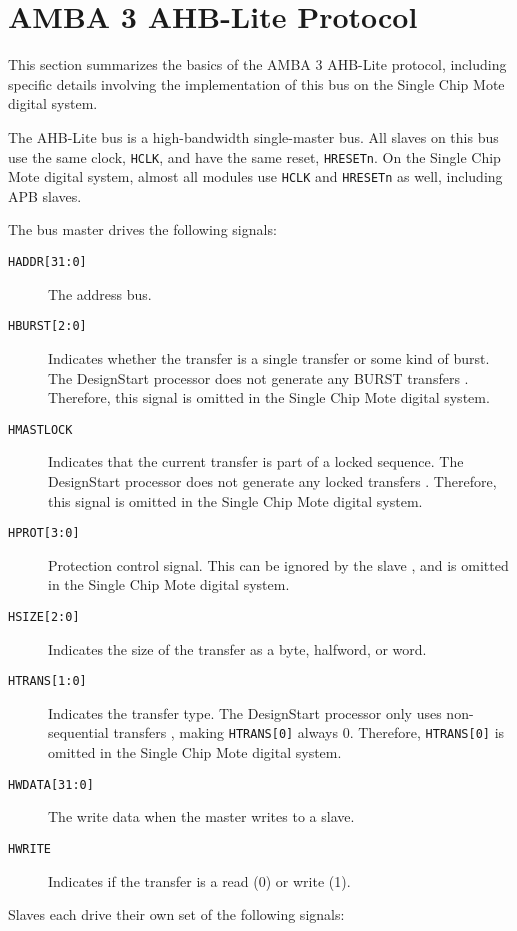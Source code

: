 \section{AMBA 3 AHB-Lite Protocol}
This section summarizes the basics of the AMBA 3 AHB-Lite protocol, including specific details involving the implementation of this bus on the Single Chip Mote digital system.

The AHB-Lite bus is a high-bandwidth single-master bus. All slaves on this bus use the same clock, \texttt{HCLK}, and have the same reset, \texttt{HRESETn}. On the Single Chip Mote digital system, almost all modules use \texttt{HCLK} and \texttt{HRESETn} as well, including APB slaves.

The bus master drives the following signals:

\begin{description}
	\item[\texttt{HADDR[31:0]}] The address bus.
	\item[\texttt{HBURST[2:0]}] Indicates whether the transfer is a single transfer or some kind of burst. The DesignStart processor does not generate any BURST transfers \cite{ahblite-mit}. Therefore, this signal is omitted in the Single Chip Mote digital system.
	\item[\texttt{HMASTLOCK}] Indicates that the current transfer is part of a locked sequence. The DesignStart processor does not generate any locked transfers \cite{ahblite-mit}. Therefore, this signal is omitted in the Single Chip Mote digital system.
	\item[\texttt{HPROT[3:0]}] Protection control signal. This can be ignored by the slave \cite{ahblite-mit}, and is omitted in the Single Chip Mote digital system.
	\item[\texttt{HSIZE[2:0]}] Indicates the size of the transfer as a byte, halfword, or word.
	\item[\texttt{HTRANS[1:0]}] Indicates the transfer type. The DesignStart processor only uses non-sequential transfers \cite{ahblite-mit}, making \texttt{HTRANS[0]} always 0. Therefore, \texttt{HTRANS[0]} is omitted in the Single Chip Mote digital system.
	\item[\texttt{HWDATA[31:0]}] The write data when the master writes to a slave.
	\item[\texttt{HWRITE}] Indicates if the transfer is a read (0) or write (1).
\end{description}

Slaves each drive their own set of the following signals:

